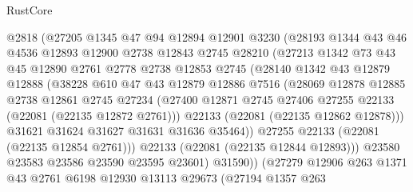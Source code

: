\begin{lexlean}{RustCore}
\begin{coremodule}
                @2818
                (@27205
                  @1345
                  @47
                  @94
                  @12894
                  @12901
                  @3230
                  (@28193
                    @1344
                    @43
                    @46
                    @4536
                    @12893
                    @12900
                    @2738
                    @12843
                    @2745
                    @28210
                    (@27213
                      @1342
                      @73
                      @43
                      @45
                      @12890
                      @2761
                      @2778
                      @2738
                      @12853
                      @2745
                      (@28140
                        @1342
                        @43
                        @12879
                        @12888
                        (@38228
                          @610
                          @47
                          @43
                          @12879
                          @12886
                          @7516
                          (@28069
                            @12878
                            @12885
                            @2738
                            @12861
                            @2745
                            @27234
                            (@27400
                              @12871
                              @2745
                              @27406
                              @27255
                              @22133
                              (@22081 (@22135 @12872 @2761)))
                            @22133
                            (@22081 (@22135 @12862 @12878)))
                          @31621
                          @31624
                          @31627
                          @31631
                          @31636
                          @35464))
                      @27255
                      @22133
                      (@22081 (@22135 @12854 @2761)))
                    @22133
                    (@22081 (@22135 @12844 @12893)))
                  @23580
                  @23583
                  @23586
                  @23590
                  @23595
                  @23601)
                @31590))
            (@27279
              @12906
              @263
              @1371
              @43
              @2761
              @6198
              @12930
              @13113
              @29673
              (@27194
                @1357
                @263

\end{coremodule}
\end{lexlean}
